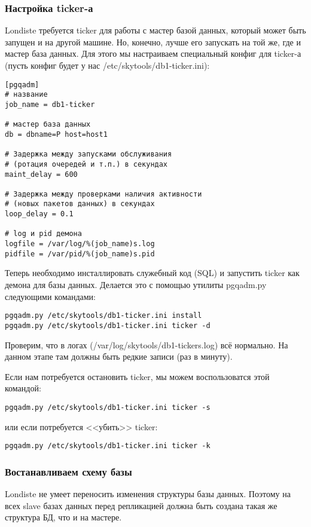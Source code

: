 \subsubsection{Настройка ticker-а}
Londiste требуется ticker для работы с мастер базой данных, который может быть запущен и на другой машине. 
Но, конечно, лучше его запускать на той же, где и мастер база данных. Для этого мы настраиваем специальный 
конфиг для ticker-а (пусть конфиг будет у нас /etc/skytools/db1-ticker.ini):
\begin{verbatim}
[pgqadm]
# название
job_name = db1-ticker

# мастер база данных 
db = dbname=P host=host1 

# Задержка между запусками обслуживания 
# (ротация очередей и т.п.) в секундах
maint_delay = 600

# Задержка между проверками наличия активности 
# (новых пакетов данных) в секундах
loop_delay = 0.1

# log и pid демона
logfile = /var/log/%(job_name)s.log
pidfile = /var/pid/%(job_name)s.pid
\end{verbatim}

Теперь необходимо инсталлировать служебный код (SQL) и запустить ticker как демона для базы данных. 
Делается это с помощью утилиты pgqadm.py следующими командами:
\begin{verbatim}
pgqadm.py /etc/skytools/db1-ticker.ini install
pgqadm.py /etc/skytools/db1-ticker.ini ticker -d
\end{verbatim}

Проверим, что в логах (/var/log/skytools/db1-tickers.log) всё нормально. На данном этапе там должны быть редкие записи (раз в минуту).

Если нам потребуется остановить ticker, мы можем воспользоватся этой командой:
\begin{verbatim}
pgqadm.py /etc/skytools/db1-ticker.ini ticker -s
\end{verbatim}
или если потребуется <<убить>> ticker:
\begin{verbatim}
pgqadm.py /etc/skytools/db1-ticker.ini ticker -k
\end{verbatim}

\subsubsection{Востанавливаем схему базы}
Londiste не умеет переносить изменения структуры базы данных. 
Поэтому на всех slave базах данных перед репликацией должна быть создана такая же структура БД, что и на мастере.

